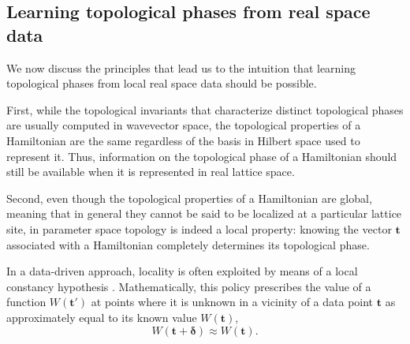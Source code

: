 \documentclass[10pt]{revtex4-1}
\begin{document}
\subsection*{Learning topological phases from real space data}


We now discuss the principles that lead us to the intuition that learning topological phases from local real space data should be possible.

First, while the topological invariants that characterize distinct topological phases are usually computed in wavevector space, the topological properties of a Hamiltonian are the same regardless of the basis in Hilbert space used to represent it. Thus, information on the topological phase of a Hamiltonian should still be available when it is represented in real lattice space. 

Second, even though the topological properties of a Hamiltonian are global, meaning that in general they cannot be said to be localized at a particular lattice site, in parameter space topology is indeed a local property: knowing the vector $\mathbf{t}$ associated with a Hamiltonian completely determines its topological phase.

In a data-driven approach, locality is often exploited by means of a local constancy hypothesis \cite{goodfellow2016deep}. Mathematically, this policy prescribes the value of a function $W(\mathbf{t}')$ at points where it is unknown in a vicinity of a data point $\mathbf{t}$ as approximately equal to its known value $W(\mathbf{t})$,
\begin{equation}
\label{localconstancy}
W(\mathbf{t} + \boldsymbol{\delta}) \approx W(\mathbf{t}).
\end{equation}
\end{document}
